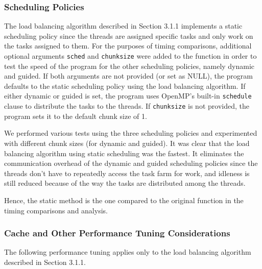 \subsubsection{Scheduling Policies}
The load balancing algorithm described in Section 3.1.1 implements a static scheduling policy since the threads are assigned specific tasks and only work on the tasks assigned to them. For the purposes of timing comparisons, additional optional arguments \texttt{sched} and \texttt{chunksize} were added to the function in order to test the speed of the program for the other scheduling policies, namely dynamic and guided. If both arguments are not provided (or set as NULL), the program defaults to the static scheduling policy using the load balancing algorithm. If either dynamic or guided is set, the program uses OpenMP's built-in \texttt{schedule} clause to distribute the tasks to the threads. If \texttt{chunksize} is not provided, the program sets it to the default chunk size of 1.\\
\null

We performed various tests using the three scheduling policies and experimented with different chunk sizes (for dynamic and guided). It was clear that the load balancing algorithm using static scheduling was the fastest. It eliminates the communication overhead of the dynamic and guided scheduling policies since the threads don't have to repeatedly access the task farm for work, and idleness is still reduced because of the way the tasks are distributed among the threads.\\
\null

Hence, the static method is the one compared to the original function in the timing comparisons and analysis.

\subsubsection{Cache and Other Performance Tuning Considerations}
The following performance tuning applies only to the load balancing algorithm described in Section 3.1.1.

